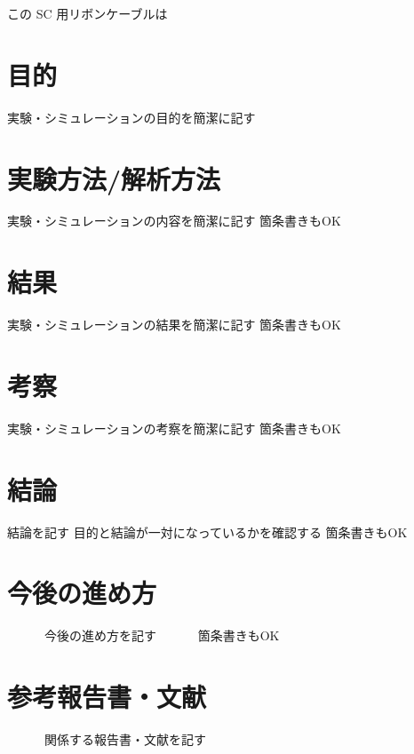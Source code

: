 \documentclass[
  report,
  a4paper,
  12pt,
  paperwidth=210mm,
  paperheight=297mm,
  hoffset=0mm,
  voffset=0mm,
  textwidth=175mm, %
  textheight=267mm %
]{jlreq}
\begin{document}
この SC 用リボンケーブルは

\chapter{目的}
実験・シミュレーションの目的を簡潔に記す
\chapter{実験方法/解析方法}
実験・シミュレーションの内容を簡潔に記す
箇条書きもOK
\chapter{結果}
実験・シミュレーションの結果を簡潔に記す
箇条書きもOK
\chapter{考察 }
実験・シミュレーションの考察を簡潔に記す
箇条書きもOK
\chapter{結論}
結論を記す
目的と結論が一対になっているかを確認する
箇条書きもOK
\chapter{今後の進め方}
　　　今後の進め方を記す
　　　箇条書きもOK
\chapter{参考報告書・文献}
　　　関係する報告書・文献を記す
\end{document}
